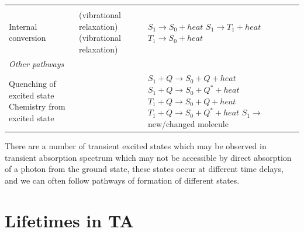 \documentclass[
]{book}
\begin{document}
\begin{longtable}[]{@{}lll@{}}
\begin{minipage}[t]{0.33\columnwidth}
\strut
\end{minipage} & \begin{minipage}[t]{0.23\columnwidth}\raggedright
\strut
\end{minipage}\tabularnewline
\begin{minipage}[t]{0.35\columnwidth}\raggedright
Internal conversion \strut
\end{minipage} & \begin{minipage}[t]{0.33\columnwidth}\raggedright
(vibrational relaxation) (vibrational relaxation)\strut
\end{minipage} & \begin{minipage}[t]{0.23\columnwidth}\raggedright
\(S_1 \longrightarrow S_0 + heat\) \(S_1 \longrightarrow T_1 + heat\) \(T_1 \longrightarrow S_0 + heat\)\strut
\end{minipage}\tabularnewline
\begin{minipage}[t]{0.35\columnwidth}\raggedright
\emph{Other pathways}\strut
\end{minipage} & \begin{minipage}[t]{0.33\columnwidth}\raggedright
\strut
\end{minipage} & \begin{minipage}[t]{0.23\columnwidth}\raggedright
\strut
\end{minipage}\tabularnewline
\begin{minipage}[t]{0.35\columnwidth}\raggedright
Quenching of excited state Chemistry from excited state\strut
\end{minipage} & \begin{minipage}[t]{0.33\columnwidth}\raggedright
\strut
\end{minipage} & \begin{minipage}[t]{0.23\columnwidth}\raggedright
\(S_1 + Q \longrightarrow S_0 + Q +heat\) \(S_1 + Q \longrightarrow S_0 + Q^\ast +heat\) \(T_1 + Q \longrightarrow S_0 + Q +heat\) \(T_1 + Q \longrightarrow S_0 + Q^\ast +heat\) \(S_1 \longrightarrow\) new/changed molecule\strut
\end{minipage}\tabularnewline
\bottomrule
\end{longtable}

There are a number of transient excited states which may be observed in transient absorption spectrum which may not be accessible by direct absorption of a photon from the ground state, these states occur at different time delays, and we can often follow pathways of formation of different states.

\hypertarget{lifetimes-in-ta}{%
\section{Lifetimes in TA}\label{lifetimes-in-ta}}
\end{document}
